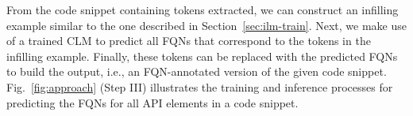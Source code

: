 From the code snippet containing \blank tokens extracted, we can construct an infilling example similar to the one described in Section~\ref{sec:ilm-train}. Next, we make use of a trained CLM to predict all FQNs that correspond to the \blank tokens in the infilling example.
Finally, these \blank tokens can be replaced with the predicted FQNs to build the output, i.e., an FQN-annotated version of the given code snippet. Fig.~\ref{fig:approach} (Step III) illustrates the training and inference processes for predicting the FQNs for all API elements in a code snippet.
